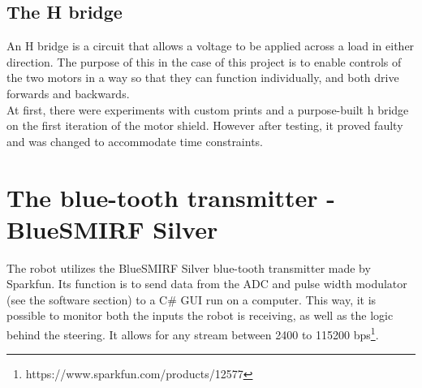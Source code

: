 \subsection{The H bridge}
An H bridge is a circuit that allows a voltage to be applied across a load in either direction. The purpose of this in the case of this project is to enable controls of the two motors in a way so that they can function individually, and both drive forwards and backwards.\\
At first, there were experiments with custom prints and a purpose-built h bridge on the first iteration of the motor shield. However after testing, it proved faulty and was changed to accommodate time constraints.

\section{The blue-tooth transmitter - BlueSMIRF Silver}
The robot utilizes the BlueSMIRF Silver blue-tooth transmitter made by Sparkfun. Its function is to send data from the ADC and pulse width modulator (see the software section) to a C\# GUI run on a computer. This way, it is possible to monitor both the inputs the robot is receiving, as well as the logic behind the steering. It allows for any stream between 2400 to 115200 bps\footnote{https://www.sparkfun.com/products/12577}. 
